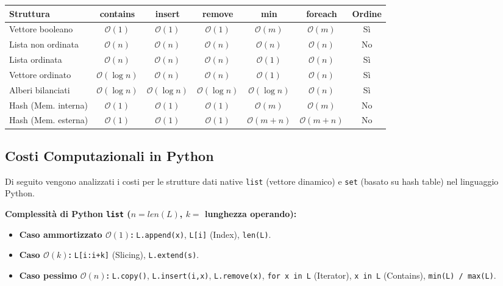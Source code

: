 \documentclass[12pt, a4paper]{article}
\begin{document}
\begin{table}[H]
\centering
\begin{tabular}{@{}lcccccc@{}}
\toprule
\textbf{Struttura} & \textbf{contains} & \textbf{insert} & \textbf{remove} & \textbf{min} & \textbf{foreach} & \textbf{Ordine} \\ \midrule

Vettore booleano & $\mathcal{O}(1)$ & $\mathcal{O}(1)$ & $\mathcal{O}(1)$ & $\mathcal{O}(m)$ & $\mathcal{O}(m)$ & Sì \\

Lista non ordinata & $\mathcal{O}(n)$ & $\mathcal{O}(n)$ & $\mathcal{O}(n)$ & $\mathcal{O}(n)$ & $\mathcal{O}(n)$ & No \\

Lista ordinata & $\mathcal{O}(n)$ & $\mathcal{O}(n)$ & $\mathcal{O}(n)$ & $\mathcal{O}(1)$ & $\mathcal{O}(n)$ & Sì \\

Vettore ordinato & $\mathcal{O}(\log n)$ & $\mathcal{O}(n)$ & $\mathcal{O}(n)$ & $\mathcal{O}(1)$ & $\mathcal{O}(n)$ & Sì \\

Alberi bilanciati & $\mathcal{O}(\log n)$ & $\mathcal{O}(\log n)$ & $\mathcal{O}(\log n)$ & $\mathcal{O}(\log n)$ & $\mathcal{O}(n)$ & Sì \\

Hash (Mem. interna) & $\mathcal{O}(1)$ & $\mathcal{O}(1)$ & $\mathcal{O}(1)$ & $\mathcal{O}(m)$ & $\mathcal{O}(m)$ & No \\

Hash (Mem. esterna) & $\mathcal{O}(1)$ & $\mathcal{O}(1)$ & $\mathcal{O}(1)$ & $\mathcal{O}(m+n)$ & $\mathcal{O}(m+n)$ & No \\

\bottomrule
\end{tabular}
\end{table}
\subsection{Costi Computazionali in Python}

Di seguito vengono analizzati i costi per le strutture dati native \texttt{list} (vettore dinamico) e \texttt{set} (basato su hash table) nel linguaggio Python.

\textbf{Complessità di Python \texttt{list} ($n = len(L)$, $k =$ lunghezza operando):}
\begin{itemize}
\item \textbf{Caso ammortizzato $\mathcal{O}(1)$:} \texttt{L.append(x)}, \texttt{L[i]} (Index), \texttt{len(L)}.
\item \textbf{Caso $\mathcal{O}(k)$:} \texttt{L[i:i+k]} (Slicing), \texttt{L.extend(s)}.
\item \textbf{Caso pessimo $\mathcal{O}(n)$:} \texttt{L.copy()}, \texttt{L.insert(i,x)}, \texttt{L.remove(x)}, \texttt{for x in L} (Iterator), \texttt{x in L} (Contains), \texttt{min(L) / max(L)}.
\end{itemize}
\end{document}

